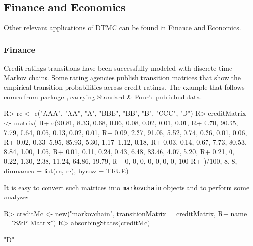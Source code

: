 \documentclass[
  nojss]{jss}
\begin{document}
\hypertarget{app:fin}{%
\subsection{Finance and Economics}\label{app:fin}}

Other relevant applications of DTMC can be found in Finance and Economics.

\hypertarget{fin:fin}{%
\subsubsection{Finance}\label{fin:fin}}

Credit ratings transitions have been successfully modeled with discrete time Markov chains. Some rating agencies publish transition matrices that show the empirical transition probabilities across credit ratings. The example that follows
comes from   package \citep{CreditMetricsR},
carrying Standard \& Poor's published data.

\begin{CodeChunk}

\begin{CodeInput}
R> rc <- c("AAA", "AA", "A", "BBB", "BB", "B", "CCC", "D")
R> creditMatrix <- matrix(
R+   c(90.81, 8.33, 0.68, 0.06, 0.08, 0.02, 0.01, 0.01,
R+     0.70, 90.65, 7.79, 0.64, 0.06, 0.13, 0.02, 0.01,
R+     0.09, 2.27, 91.05, 5.52, 0.74, 0.26, 0.01, 0.06,
R+     0.02, 0.33, 5.95, 85.93, 5.30, 1.17, 1.12, 0.18,
R+     0.03, 0.14, 0.67, 7.73, 80.53, 8.84, 1.00, 1.06,
R+     0.01, 0.11, 0.24, 0.43, 6.48, 83.46, 4.07, 5.20,
R+     0.21, 0, 0.22, 1.30, 2.38, 11.24, 64.86, 19.79,
R+     0, 0, 0, 0, 0, 0, 0, 100
R+    )/100, 8, 8, dimnames = list(rc, rc), byrow = TRUE)
\end{CodeInput}
\end{CodeChunk}

It is easy to convert such matrices into \texttt{markovchain} objects and to perform some analyses

\begin{CodeChunk}

\begin{CodeInput}
R> creditMc <- new("markovchain", transitionMatrix = creditMatrix, 
R+                 name = "S&P Matrix")
R> absorbingStates(creditMc)
\end{CodeInput}

\begin{CodeOutput}
[1] "D"
\end{CodeOutput}
\end{CodeChunk}
\end{document}
